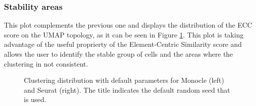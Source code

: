 \subsubsection{Stability areas}
This plot complements the previous one and displays the distribution of the ECC score on the UMAP topology, as it can be seen in Figure \ref{fig:ca-feat-stab}. This plot is taking advantage of the useful proprierty of the Element-Centric Similarity score and allows the user to identify the stable group of cells and the areas where the clustering in not consistent.

\begin{figure}[H]
    \centering
    \caption{\label{fig:ca-feat-stab}Clustering distribution with default parameters for Monocle (left) and Seurat (right). The title indicates the default random seed that is used.}
\end{figure}

